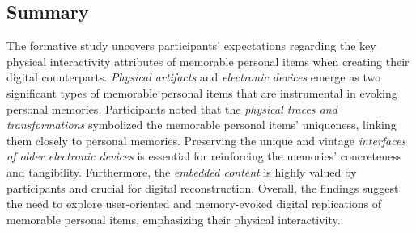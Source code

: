 \subsection{Summary}
The formative study uncovers participants' expectations regarding the key physical interactivity attributes of memorable personal items when creating their digital counterparts.
\textit{Physical artifacts} and \textit{electronic devices} emerge as two significant types of memorable personal items that are instrumental in evoking personal memories.
Participants noted that the \textit{physical traces and transformations} symbolized the memorable personal items' uniqueness, linking them closely to personal memories. 
Preserving the unique and vintage \textit{interfaces of older electronic devices} is essential for reinforcing the memories' concreteness and tangibility. 
Furthermore, the \textit{embedded content} is highly valued by participants and crucial for digital reconstruction.
Overall, the findings suggest the need to explore user-oriented and memory-evoked digital replications of memorable personal items, emphasizing their physical interactivity.

